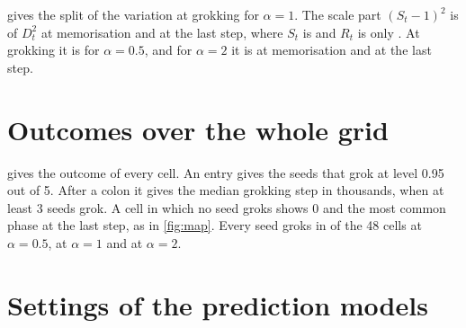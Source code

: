 \documentclass[a4paper,11pt]{article} %
\begin{document}
 gives the split of the variation at grokking for $\alpha=1$.
The scale part $(S_t-1)^2$ is \NtwoAOneMem{} of $D_t^2$ at memorisation and
\NtwoAOneFinal{} at the last step, where $S_t$ is \NtwoAOneSfinal{} and $R_t$
is only \NtwoAOneRfinal. At grokking it is \NtwoAHalfGrok{} for $\alpha=0.5$,
and for $\alpha=2$ it is \NtwoATwoMem{} at memorisation and \NtwoATwoFinal{}
at the last step.

\begin{table}[htbp]
  \centering\footnotesize
  \caption{The baseline setting by setting. \enquote{Where} is the place in
  \citet[arXiv v3]{kumarGrokkingTransitionLazy2024} that gives the setting.}
  \label{tab:kumar-settings}
  
\end{table}

\begin{table}[htbp]
  \centering\footnotesize
  \caption{Event steps at $N=100$ and $\eta\lambda=0$. The values of
    \citet{kumarGrokkingTransitionLazy2024} are read by eye from their Fig.~2(a)
  and (c), so they are approximate.}
  \label{tab:kumar-events}
  
\end{table}

\section{Outcomes over the whole grid}\label{app:grid}

 gives the outcome of every cell. An entry gives the seeds that
grok at level 0.95 out of 5. After a colon it gives the median grokking step in
thousands, when at least 3 seeds grok. A cell in which no seed groks shows 0 and
the most common phase at the last step, as in \cref{fig:map}. Every
seed groks in
\EthirteenAHalfAllGrok{} of the 48 cells at $\alpha=0.5$,
\EthirteenAOneAllGrok{}
at $\alpha=1$ and \EthirteenATwoAllGrok{} at $\alpha=2$.

\begin{table}[htbp]
  \centering\footnotesize
  \caption{Outcomes over the whole grid at level 0.95: seeds that grok out of 5,
  and the median grokking step in thousands.}
  \label{tab:grid}
  
\end{table}


\section{Settings of the prediction models}\label{app:fitting}
\end{document}
